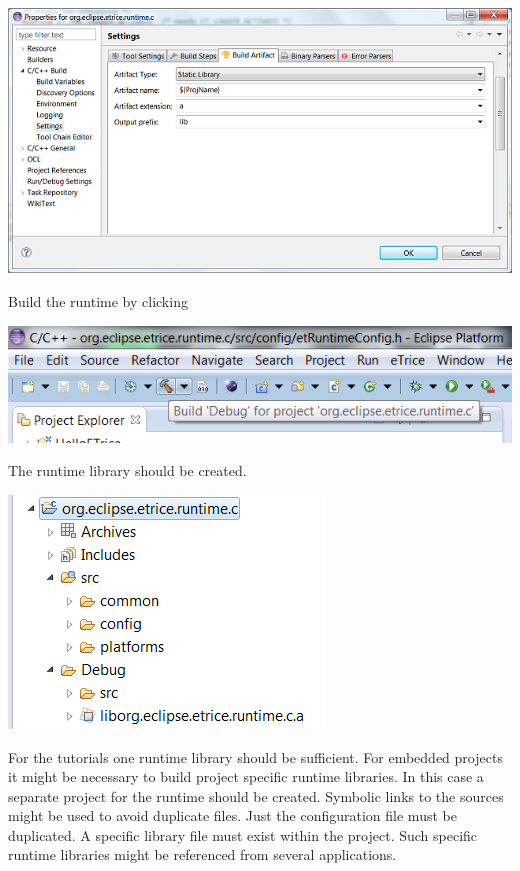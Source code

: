 \includegraphics{images/014-SetupWorkspaceC09.png}

Build the runtime by clicking

\includegraphics{images/014-SetupWorkspaceC10.png}

The runtime library should be created.

\includegraphics{images/014-SetupWorkspaceC11.png}

For the tutorials one runtime library should be sufficient. For embedded projects it might be necessary to 
build project specific runtime libraries. In this case a separate project for the runtime should be 
created. Symbolic links to the sources might be used to avoid duplicate files. Just the configuration file 
must be duplicated. A specific library file must exist within the project. Such specific runtime libraries 
might be referenced from several applications.     
